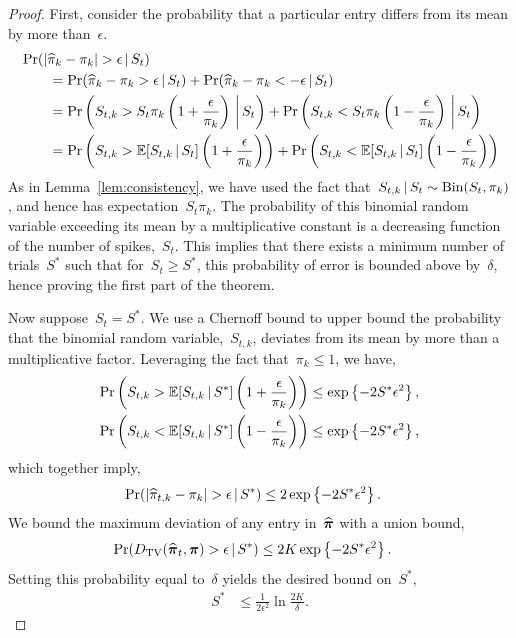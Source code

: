 \begin{proof}
First, consider the probability that a particular entry differs from its mean by more than~$\epsilon$.
\begin{align}
  &\Pr(|\widehat{\pi}_k - \pi_k |  > \epsilon \,|\, S_t) \\
  &\qquad= \Pr(\widehat{\pi}_k - \pi_k  > \epsilon \,|\, S_t) + 
  \Pr(\widehat{\pi}_k - \pi_k  < -\epsilon \,|\, S_t) \\
  &\qquad= \Pr \left(S_{t, k} > S_t \pi_{ k} \left(1+\frac{\epsilon}{\pi_{ k}} \right) \, \bigg| \, S_t \right) 
  +\Pr \left(S_{t, k} < S_t \pi_{ k} \left(1-\frac{\epsilon}{\pi_{ k}} \right) \, \bigg| \, S_t\right) \\
  &\qquad= \Pr \left(S_{t, k} > \mathbb{E}[S_{t,k} \,|\, S_t] \left(1+\frac{\epsilon}{\pi_{ k}} \right) \right) 
   +\Pr \left(S_{t, k} < \mathbb{E}[S_{t,k} \,|\, S_t] \left(1-\frac{\epsilon}{\pi_{ k}} \right) \right)
\end{align}
As in Lemma~\ref{lem:consistency}, we have used the fact
that~$S_{t, k} \,|\, S_t \sim \mathrm{Bin}(S_t, \pi_{ k})$,
and hence has expectation~$S_t \pi_{ k}$. 
The probability of this binomial random variable exceeding its mean 
by a multiplicative constant is a decreasing function of the 
number of spikes,~$S_t$. This implies that there exists a minimum 
number of trials~$S^*$ such that for~$S_t \geq S^*$, this probability 
of error is bounded above by~$\delta$, hence proving the first part 
of the theorem.

Now suppose~$S_t=S^*$.  We use a Chernoff bound to upper bound the
probability that the binomial random variable,~$S_{t,k}$, deviates
from its mean by more than a multiplicative factor. Leveraging the
fact that~$\pi_{k} \leq 1$, we have,
\begin{align}
  \Pr \left(S_{t,k} > \mathbb{E}[S_{t,k} \,|\, S^*] \left(1+\frac{\epsilon}{\pi_{k}} \right) \right) 
  &\leq \exp \left \{-2S^* \epsilon^2 \right \}, \\
  \Pr \left(S_{t,k} < \mathbb{E}[S_{t,k} \,|\, S^*] \left(1-\frac{\epsilon}{\pi_{k}} \right) \right) 
  &\leq \exp \left \{-2S^* \epsilon^2 \right \},
\end{align}
which together imply,
\begin{align}
  \Pr(|\widehat{\pi}_{t,k} - \pi_{k} |  > \epsilon \,|\, S^*) 
  &\leq 2 \exp \left \{-2S^* \epsilon^2 \right \}.
\end{align}
We bound the maximum deviation of any entry in~$\widehat{\boldsymbol{\pi}}$ with a union bound,
\begin{align}
  \Pr({D_{\mathrm{TV}}}(\widehat{\boldsymbol{\pi}}_t, \boldsymbol{\pi}) > \epsilon \,|\, S^*) 
  & \leq 2K \exp \left\{-2S^* \epsilon^2 \right\}.
\end{align}
Setting this probability equal to~$\delta$ yields the desired bound on~$S^*$,
\begin{align}
  S^* &\leq \frac{1}{2\epsilon^2} \ln \frac{2K}{\delta}.
\end{align}

\end{proof}


